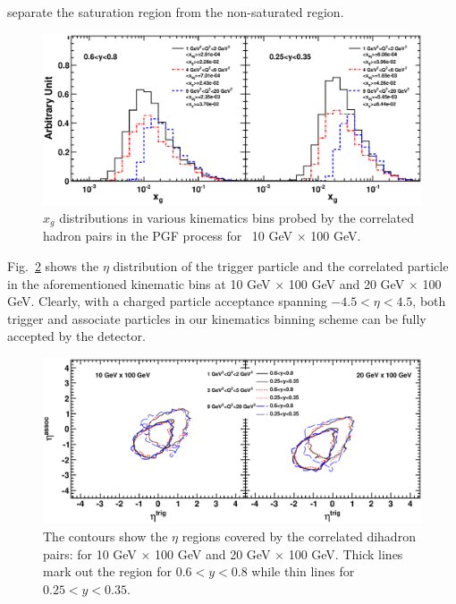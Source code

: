 separate the saturation region from the non-saturated region.
\begin{figure}
\begin{center}
\includegraphics[width=1.0\textwidth]{plots/chpt6/ep_10x100_xg_distribution_multibins.eps} 
\end{center} 
\caption[$x_{g}$ coverage distribution constrained in various kinematic bins]{$x_{g}$ distributions in various kinematics bins
probed by the correlated hadron pairs in the PGF process for \ep\ 10 GeV
$\times$ 100 GeV. }
\label{fig:xgCover} 
\end{figure}
Fig.~\ref{fig:pairEta} shows the $\eta$ distribution of the trigger
particle and the correlated particle in the aforementioned kinematic
bins at 10 GeV $\times$ 100 GeV and 20 GeV $\times$ 100 GeV. Clearly, with a
charged particle acceptance spanning $-4.5<\eta<4.5$, both trigger and
associate particles in our kinematics binning scheme can be fully accepted by
the detector.
\begin{figure}
\begin{center}
\includegraphics[width=1.0\textwidth]{plots/chpt6/ep_10And20x100_trig_2_asso_1_z_0.2_0.4_multiBin_etaCorre.eps}
\end{center} 
\caption[$\eta$ distribution of the trigger/associate particles in the dihadron pairs]{The contours show the
$\eta$ regions covered by the correlated dihadron pairs: for 10 GeV $\times$ 100
GeV and 20 GeV $\times$ 100 GeV. Thick lines mark out the region for $0.6<y<0.8$
while thin lines for $0.25<y<0.35$.}
\label{fig:pairEta} 
\end{figure}


